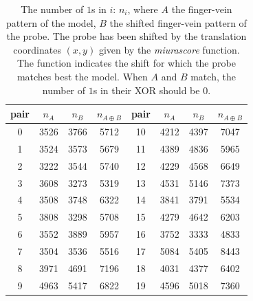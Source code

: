 \begin{table}[h!]
\small
    \centering
    \begin{tabular}{c|c|c|c!{\vrule width 0.7pt}c|c|c|c}
    pair & $n_A$ & $n_B$ & $n_{A \oplus B}$ & pair & $n_A$ & $n_B$ & $n_{A \oplus B}$   \\  & 3526 & 3766 & 5712 & 10 & 4212 & 4397 & 7047 \\
1 & 3524 & 3573 & 5679 & 11 & 4389 & 4836 & 5965 \\
2 & 3222 & 3544 & 5740 & 12 & 4229 & 4568 & 6649\\    
3 & 3608 & 3273 & 5319 & 13 & 4531 & 5146 & 7373 \\
4 & 3508 & 3748 & 6322 & 14 & 3841 & 3791 & 5534 \\    
5 & 3808 & 3298 & 5708 & 15 & 4279 & 4642 & 6203 \\    
6 & 3552 & 3889 & 5957 & 16 & 3752 & 3333 & 4833  \\    
7 & 3504 & 3536 & 5516 & 17 & 5084 & 5405 & 8443  \\    
8 & 3971 & 4691 & 7196 & 18 & 4031 & 4377 & 6402\\    
9 & 4963 & 5417 & 6822 & 19 & 4596 & 5018 & 7360  
    \end{tabular}
        \caption{The number of $1$s in $i$: $n_i$, where $A$ the finger-vein pattern of the model, $B$ the shifted finger-vein pattern of the probe. The probe has been shifted by the translation coordinates $(x,y)$ given by the \textit{miurascore} function. The function indicates the shift for which the probe matches best the model. When $A$ and $B$ match, the number of $1$s in their XOR should be $0$.
        }
    \label{tab:nrof1s}
    
\end{table}